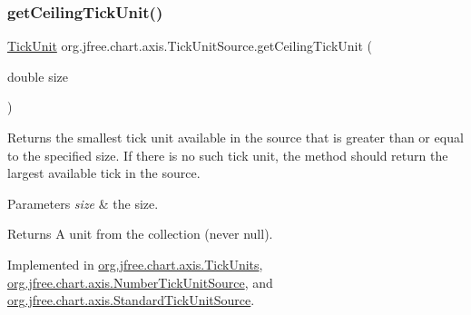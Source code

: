 \mbox{\label{interfaceorg_1_1jfree_1_1chart_1_1axis_1_1_tick_unit_source_a875d23e3610749f233950f61a855360d}} 
\subsubsection{\texorpdfstring{get\+Ceiling\+Tick\+Unit()}{getCeilingTickUnit()}\hspace{0.1cm}{\footnotesize\ttfamily [2/2]}}
{\footnotesize\ttfamily \mbox{\hyperlink{classorg_1_1jfree_1_1chart_1_1axis_1_1_tick_unit}{Tick\+Unit}} org.\+jfree.\+chart.\+axis.\+Tick\+Unit\+Source.\+get\+Ceiling\+Tick\+Unit (\begin{DoxyParamCaption}\item[{double}]{size }\end{DoxyParamCaption})}

Returns the smallest tick unit available in the source that is greater than or equal to the specified size. If there is no such tick unit, the method should return the largest available tick in the source.


\begin{DoxyParams}{Parameters}
{\em size} & the size.\\
\hline
\end{DoxyParams}
\begin{DoxyReturn}{Returns}
A unit from the collection (never {\ttfamily null}). 
\end{DoxyReturn}


Implemented in \mbox{\hyperlink{classorg_1_1jfree_1_1chart_1_1axis_1_1_tick_units_ac65181d78c8783d8094d8b28273c37da}{org.\+jfree.\+chart.\+axis.\+Tick\+Units}}, \mbox{\hyperlink{classorg_1_1jfree_1_1chart_1_1axis_1_1_number_tick_unit_source_a552cf17dfcced017ee6497a433a9467a}{org.\+jfree.\+chart.\+axis.\+Number\+Tick\+Unit\+Source}}, and \mbox{\hyperlink{classorg_1_1jfree_1_1chart_1_1axis_1_1_standard_tick_unit_source_a93fbb960c8e9c54bef76b7e147427f9d}{org.\+jfree.\+chart.\+axis.\+Standard\+Tick\+Unit\+Source}}.

\mbox{\label{interfaceorg_1_1jfree_1_1chart_1_1axis_1_1_tick_unit_source_ada1fecd32d2e0ff584a7d2a55ffc349a}} 
